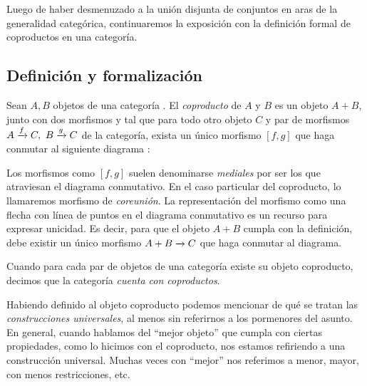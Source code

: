 \begin{agdacode}\hspace{3ex}\label{code:choice}
  
\end{agdacode}

Luego de haber desmenuzado a la unión disjunta de conjuntos en aras de la generalidad categórica, continuaremos la exposición con la definición formal de coproductos en una categoría.

\subsection{Definición y formalización}
\begin{definition}\label{cat:coprod}
  Sean $A,B$ objetos de una categoría \C.
El {\it coproducto} de $A$ y $B$ es un objeto $A + B$, junto con dos morfismos
 y
tal que para todo otro objeto $C$ y par de morfismos $\flecha{A}{f}{C},\ \flecha{B}{g}{C}$ de la categoría, exista un único morfismo $[ f,g ]$ que haga conmutar al siguiente diagrama
:
\begin{center}
  \xymatrixcolsep{3pc} \xymatrixrowsep{3pc}
  \centerline{}
\end{center}
\end{definition}

Los morfismos como $[f,g]$ suelen denominarse {\it mediales} por ser los que atraviesan el diagrama conmutativo. En el caso particular del coproducto, lo llamaremos morfismo de {\it coreunión}. La representación del morfismo como una flecha con línea de puntos en el diagrama conmutativo es un recurso para expresar unicidad. Es decir, para que el objeto $A + B$ cumpla con la definición, debe existir un único morfismo $ A+B\xrightarrow{}C$ que haga conmutar al diagrama.

Cuando para cada par de objetos de una categoría existe su objeto coproducto, decimos que la categoría {\it cuenta con coproductos}.

Habiendo definido al objeto coproducto podemos mencionar de qué se tratan las {\it construcciones universales}, al menos sin referirnos a los pormenores del asunto. En general, cuando hablamos del ``mejor objeto'' que cumpla con ciertas propiedades, como lo hicimos con el coproducto, nos estamos refiriendo a una construcción universal. Muchas veces con ``mejor'' nos referimos a menor, mayor, con menos restricciones, etc.

